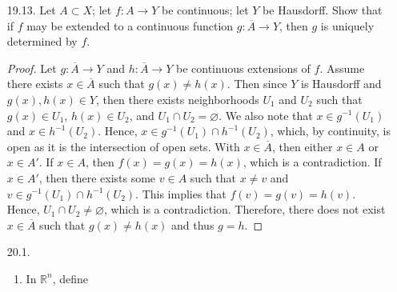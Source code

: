 \documentclass[12pt]{article}
\theoremstyle{definition}
\newcommand{\abs}[1]{\lvert #1 \rvert}
\begin{document}
\begin{enumerate}
\begin{proof}
\begin{equation*}
\begin{split}
                        &\Rightarrow \abs{y(b-a)+a-c(b-a)-a}< \varepsilon \\
                        &\Rightarrow \abs{f^{-1}(y)-f^{-1}(c)}<\varepsilon.
                    \end{split}
                \end{equation*}
                Therefore $(a, b)$ is homeomorphic to $(0, 1)$. Lastly, we note
                that both $f$ and $f^{-1}$ are defined on the end points of
                their respective intervals and that $f(a)=0$, $f(b)=1$,
                $f^{-1}(0)=a$, and $f^{-1}(1)=b$. Hence, the given function,
                $f$, also shows that $[a, b]$ and $[0, 1]$ are homeomorphic.
            \end{proof}
        \item[19.13.] Let $A\subset X$; let $f:A\to Y$ be continuous; let $Y$ be
            Hausdorff. Show that if $f$ may be extended to a continuous
            function $g:\overline{A}\to Y$, then $g$ is uniquely determined by
            $f$.
            \begin{proof}
                Let $g:\overline{A}\to Y$ and $h:\overline{A}\to Y$ be
                continuous extensions of $f$. Assume there exists 
                $x\in \overline{A}$ such that $g(x)\neq h(x)$. Then since $Y$
                is Hausdorff and $g(x), h(x)\in Y$, then there exists
                neighborhoods $U_1$ and $U_2$ such that $g(x)\in U_1$, $h(x)\in
                U_2$, and $U_1\cap U_2=\varnothing$. We also note that $x\in
                g^{-1}(U_1)$ and $x\in h^{-1}(U_2)$. Hence, $x\in
                g^{-1}(U_1)\cap h^{-1}(U_2)$, which, by continuity, is open as
                it is the intersection of open sets. With $x\in \overline{A}$,
                then either $x\in A$ or $x\in A'$. If $x\in A$, then
                $f(x)=g(x)=h(x)$, which is a contradiction. If $x\in A'$, then
                there exists some $v\in A$ such that $x\neq v$ and $v\in
                g^{-1}(U_1)\cap h^{-1}(U_2)$. This implies that
                $f(v)=g(v)=h(v)$. Hence, $U_1\cap U_2\neq\varnothing$, which is
                a contradiction. Therefore, there does not exist
                $x\in\overline{A}$ such that $g(x)\neq h(x)$ and thus $g = h$.
            \end{proof}
        \item[20.1.] 
            \begin{enumerate}[label = (\alph*)]
                \item In $\mathbb{R}^n$, define 

\end{enumerate}
\end{enumerate}
\end{document}
